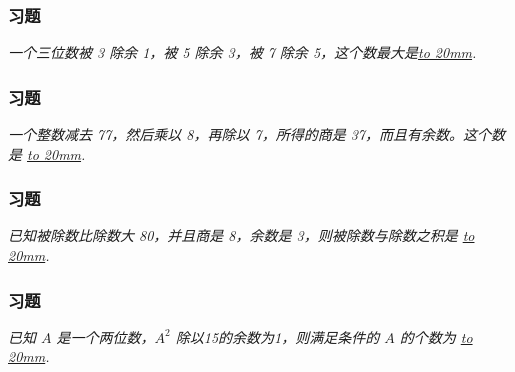 \begin{frame}
    \frametitle{习题\theframecounter}
    \vspace*{-3cm}
    \textit{一个三位数被 3 除余 1，被 5 除余 3，被 7 除余 5，这个数最大是\underline{\hbox to 20mm{}}.} 
\end{frame}

\begin{frame}
    \frametitle{习题\theframecounter}
    \vspace*{-3cm}
    \textit{一个整数减去 77，然后乘以 8，再除以 7，所得的商是 37，而且有余数。这个数是 \underline{\hbox to 20mm{}}.} 
\end{frame}

\begin{frame}
    \frametitle{习题\theframecounter}
    \vspace*{-3cm}
    \textit{已知被除数比除数大 80，并且商是 8，余数是 3，则被除数与除数之积是 \underline{\hbox to 20mm{}}.} 
\end{frame}

\begin{frame}
    \frametitle{习题\theframecounter}
    \vspace*{-3cm}
    \textit{已知 $A$ 是一个两位数，$A^2$ 除以15的余数为1，则满足条件的 $A$ 的个数为 \underline{\hbox to 20mm{}}.} 
\end{frame}
